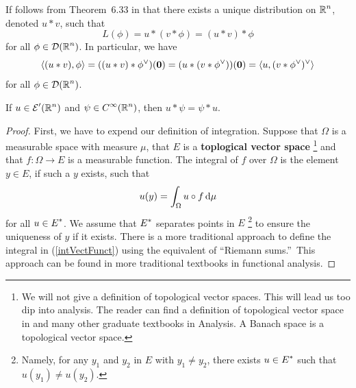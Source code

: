 If follows from Theorem~6.33 in \cite{RuFA} that there exists a unique
distribution on $\displaystyle \mathbb{R}^n$, denoted $u\ast v$, such that
\[
L(\phi) = u \ast ( v \ast \phi) = (u \ast v ) \ast \phi
\]
for all $\displaystyle \phi \in \mathcal{D}(\mathbb{R}^n)$.  In particular, we have
\[
\left\langle{(u \ast v)} , {\phi}\right\rangle = ( (u\ast v) \ast \phi^\vee)({\bm{0}}) 
= (u \ast (v \ast \phi^\vee))({\bm{0}}) 
= \left\langle{u} , { (v \ast \phi^\vee)^\vee}\right\rangle
\]
for all $\displaystyle \phi \in \mathcal{D}(\mathbb{R}^n)$.

\begin{prop} \label{uvequvu}
If $\displaystyle u\in \mathcal{E}'(\mathbb{R}^n)$ and
$\displaystyle \psi\in C^\infty(\mathbb{R}^n)$, then
$u \ast \psi = \psi \ast u$.
\end{prop}

\begin{proof}
First, we have to expend our definition of integration.
Suppose that $\Omega$ is a measurable space with measure $\mu$, that $E$
is a {\bfseries toplogical vector space} \footnote{We will not give a definition of topological
vector spaces.  This will lead us too dip into analysis.  The reader
can find a definition of topological vector space in
\cite{ReeSim,RuFA,Tr} and many other graduate textbooks in Analysis.
A Banach space is a topological vector space.}
and that $f:\Omega \to E$ is a measurable
function.  The integral of $f$ over $\Omega$ is the element $y \in E$,
if such a $y$ exists, such that
\begin{equation} \label{intVectFunct}
  u(y) = \int_\Omega u\circ f \,\mathrm{d}{\mu}
\end{equation}
for all $\displaystyle u \in E^\ast$.   We assume that
$\displaystyle E^\ast$ separates points in $E$
\footnote{Namely, for any $y_1$ and $y_2$ in
$E$ with $y_1 \neq y_2$, there exists $\displaystyle u \in E^\ast$
such that $u(y_1) \neq u(y_2)$.} to ensure the uniqueness of $y$ if it
exists.  There is a more traditional approach to define the integral
in (\ref{intVectFunct}) using the equivalent of ``Riemann sums.''\
This approach can be found in more traditional textbooks in functional
analysis.


\end{proof}

